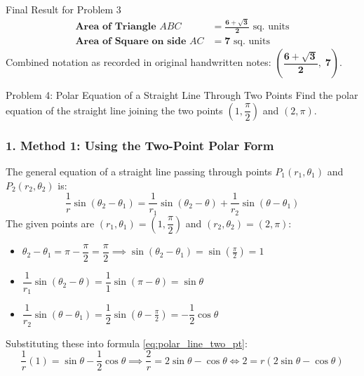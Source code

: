 \documentclass[11pt,a4paper]{article}
\begin{document}
\vspace{5mm}
\noindent
\begin{ansbox}{Final Result for Problem 3}
\begin{align*}
\textbf{Area of Triangle } ABC &= \mathbf{\frac{6 + \sqrt{3}}{2}} \text{ sq. units} \\[2mm]
\textbf{Area of Square on side } AC &= \mathbf{7} \text{ sq. units}
\end{align*}
Combined notation as recorded in original handwritten notes: $\mathbf{\left(\dfrac{6+\sqrt{3}}{2},\; 7\right)}$.
\end{ansbox}

\clearpage
\noindent
\begin{problembox}{Problem 4: Polar Equation of a Straight Line Through Two Points}
Find the polar equation of the straight line joining the two points $\left(1, \dfrac{\pi}{2}\right)$ and $(2, \pi)$.
\end{problembox}

\subsubsection*{1. Method 1: Using the Two-Point Polar Form}
The general equation of a straight line passing through points $P_1(r_1, \theta_1)$ and $P_2(r_2, \theta_2)$ is:
\begin{equation}\label{eq:polar_line_two_pt}
\frac{1}{r}\sin(\theta_2 - \theta_1) = \frac{1}{r_1}\sin(\theta_2 - \theta) + \frac{1}{r_2}\sin(\theta - \theta_1)
\end{equation}
The given points are $(r_1, \theta_1) = \left(1, \dfrac{\pi}{2}\right)$ and $(r_2, \theta_2) = (2, \pi)$:
\begin{itemize}\setlength{\itemsep}{1.5pt}
    \item $\theta_2 - \theta_1 = \pi - \dfrac{\pi}{2} = \dfrac{\pi}{2} \implies \sin(\theta_2 - \theta_1) = \sin\left(\frac{\pi}{2}\right) = 1$
    \item $\dfrac{1}{r_1}\sin(\theta_2 - \theta) = \dfrac{1}{1}\sin(\pi - \theta) = \sin\theta$
    \item $\dfrac{1}{r_2}\sin(\theta - \theta_1) = \dfrac{1}{2}\sin\left(\theta - \frac{\pi}{2}\right) = -\dfrac{1}{2}\cos\theta$
\end{itemize}
Substituting these into formula \eqref{eq:polar_line_two_pt}:
\[
\frac{1}{r}(1) = \sin\theta - \frac{1}{2}\cos\theta \implies \frac{2}{r} = 2\sin\theta - \cos\theta \iff 2 = r(2\sin\theta - \cos\theta)
\]
\end{document}
